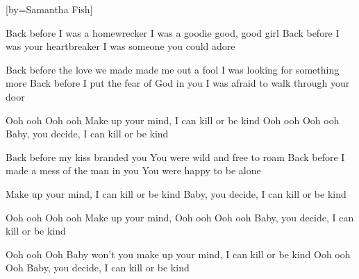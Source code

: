 [by={Samantha Fish}]

  
  \beginverse
  Back before I was a homewrecker
  I was a goodie good, good girl
  Back before I was your heartbreaker
  I was someone you could adore
  \endverse
  
  \beginverse    
  Back before the love we made made me out a fool
  I was looking for something more
  Back before I put the fear of God in you
  I was afraid to walk through your  door
  \endverse
  
  \beginchorus
  Ooh ooh Ooh ooh   
  Make up your mind,
  I can kill or be kind 
  Ooh ooh Ooh ooh   
  Baby, you decide, 
  I can kill or be kind
  \endchorus
  
  \beginverse  
  Back before my kiss branded you
  You were wild and free to roam
  Back before I made a mess of the man in you
  You were happy to be alone
  \endverse
  
  \beginchorus  
  Make up your mind,
  I can kill or be kind
  Baby, you decide,
  I can kill or be kind
  \endchorus
  
  
  \beginchorus
  Ooh ooh Ooh ooh   
  Make up your mind,
  Ooh ooh Ooh ooh   
  Baby, you decide, 
  I can  kill or be  kind
  \endchorus
  
  \beginchorus
  Ooh ooh Ooh  
  Baby won't you make up your mind,  
  I can kill or be kind 
  Ooh ooh Ooh  
  Baby, you decide, 
  I can kill or be kind
  \endchorus
\endsong
